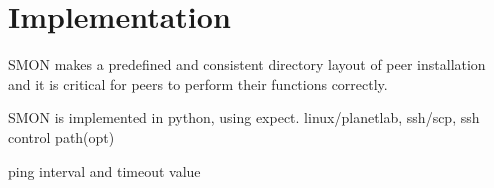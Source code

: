 \section{Implementation}

SMON makes a predefined and consistent directory layout of
peer installation and it is critical for peers to perform
their functions correctly.

SMON is implemented in python, using expect.
linux/planetlab, ssh/scp, ssh control path(opt)

ping interval and timeout value

